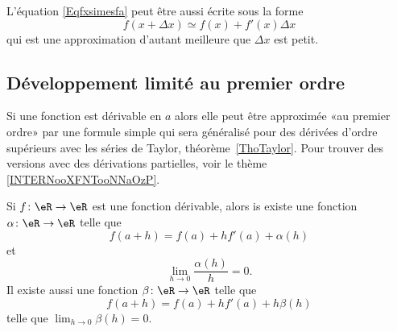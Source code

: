 L'équation \eqref{Eqfxsimesfa} peut être aussi écrite sous la forme
\begin{equation}		\label{EqfxdxSimeqfxfpx}
	f(x+\Delta x)\simeq f(x)+f'(x)\Delta x
\end{equation}
qui est une approximation d'autant meilleure que $\Delta x$ est petit.

\subsection{Développement limité au premier ordre}

Si une fonction est dérivable en \( a\) alors elle peut être approximée «au premier ordre» par une formule simple qui sera généralisé pour des dérivées d'ordre supérieurs avec les séries de Taylor, théorème~\ref{ThoTaylor}. Pour trouver des versions avec des dérivations partielles, voir le thème \ref{INTERNooXFNTooNNaOzP}.
\begin{proposition}  \label{PropUTenzfQ}
    Si \( f\colon \eR\to \eR\) est une fonction dérivable, alors is existe une fonction \( \alpha\colon \eR\to \eR\) telle que
    \begin{equation}        \label{EQooHBDHooPrVjJD}
        f(a+h)=f(a)+hf'(a)+\alpha(h)
    \end{equation}
    et
    \begin{equation}
        \lim_{h\to 0} \frac{ \alpha(h) }{ h }=0.
    \end{equation}
    Il existe aussi une fonction \( \beta\colon \eR\to \eR\) telle que
    \begin{equation}        \label{EQooPWIZooVuhjmt}
        f(a+h)=f(a)+ hf'(a)+h\beta(h)
    \end{equation}
    telle que \( \lim_{h\to 0}\beta(h)=0\).
\end{proposition}

